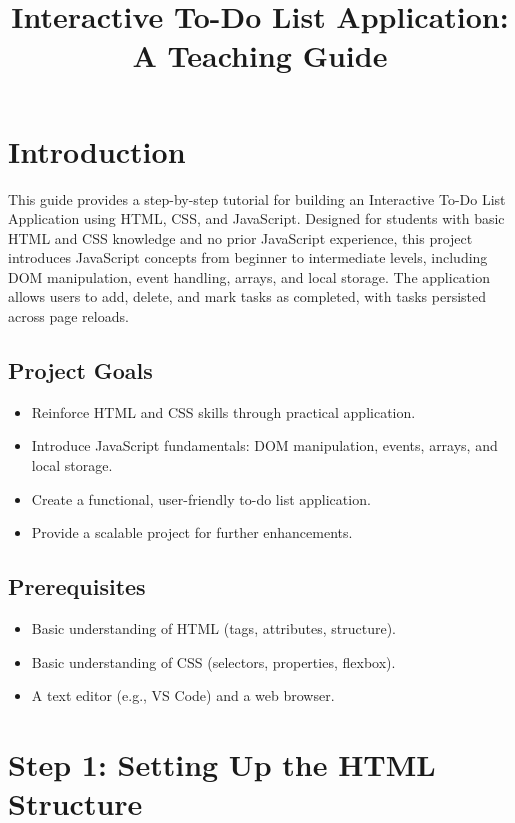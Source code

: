 \documentclass[a4paper,12pt]{article}
\begin{document}
\title{Interactive To-Do List Application: A Teaching Guide}
\author{}
\date{}
\maketitle

\section{Introduction}
This guide provides a step-by-step tutorial for building an Interactive To-Do List Application using HTML, CSS, and JavaScript. Designed for students with basic HTML and CSS knowledge and no prior JavaScript experience, this project introduces JavaScript concepts from beginner to intermediate levels, including DOM manipulation, event handling, arrays, and local storage. The application allows users to add, delete, and mark tasks as completed, with tasks persisted across page reloads.

\subsection{Project Goals}
\begin{itemize}
    \item Reinforce HTML and CSS skills through practical application.
    \item Introduce JavaScript fundamentals: DOM manipulation, events, arrays, and local storage.
    \item Create a functional, user-friendly to-do list application.
    \item Provide a scalable project for further enhancements.
\end{itemize}

\subsection{Prerequisites}
\begin{itemize}
    \item Basic understanding of HTML (tags, attributes, structure).
    \item Basic understanding of CSS (selectors, properties, flexbox).
    \item A text editor (e.g., VS Code) and a web browser.
\end{itemize}

\section{Step 1: Setting Up the HTML Structure}
\end{document}
